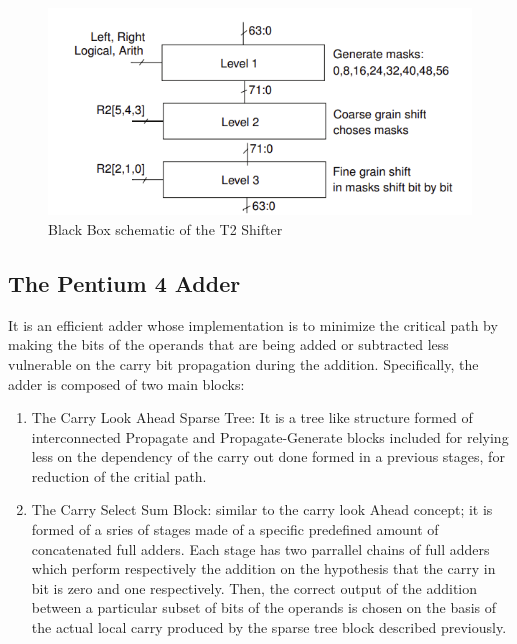     \begin{figure}[h!]
        \centering
        \includegraphics[scale = 0.8]
        {chapters/figures/T2Shifter}
        \caption{Black Box schematic of the T2 Shifter}
        \label{fig:T2Shifter}
        \end{figure}
    

    \subsection{ The Pentium 4 Adder}
    It is an efficient adder whose implementation is to minimize the critical path by making the bits of the operands that are being added or subtracted less vulnerable on 
    the carry bit propagation during the addition. Specifically, the adder is composed of two main blocks:

\begin{enumerate}
    \item The Carry Look Ahead Sparse Tree: It is a tree like structure formed of interconnected Propagate and Propagate-Generate blocks included for relying less on the dependency of the carry out done
    formed in a previous stages, for reduction of the critial path.
    \item The Carry Select Sum Block: similar to the carry look Ahead concept; it is formed of a sries of stages made of a specific predefined amount of concatenated full adders.
    Each stage has two parrallel chains of full adders  which perform respectively the addition on the hypothesis that the carry in bit is zero and one respectively.
    Then, the correct output of the addition between a particular subset of bits of the operands is chosen on the basis of the actual local carry produced by the sparse tree block described previously.
    
\end{enumerate}

